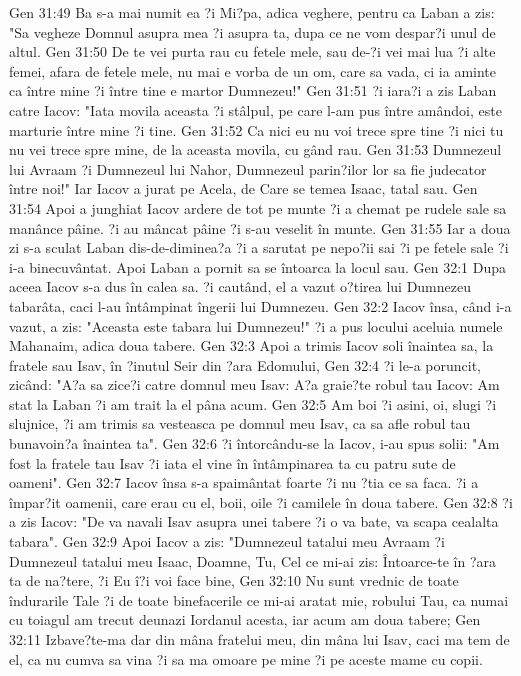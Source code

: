 Gen 31:49  Ba s-a mai numit ea ?i Mi?pa, adica veghere, pentru ca Laban a zis: "Sa vegheze Domnul asupra mea ?i asupra ta, dupa ce ne vom despar?i unul de altul.
Gen 31:50  De te vei purta rau cu fetele mele, sau de-?i vei mai lua ?i alte femei, afara de fetele mele, nu mai e vorba de un om, care sa vada, ci ia aminte ca între mine ?i între tine e martor Dumnezeu!"
Gen 31:51  ?i iara?i a zis Laban catre Iacov: "Iata movila aceasta ?i stâlpul, pe care l-am pus între amândoi, este marturie între mine ?i tine.
Gen 31:52  Ca nici eu nu voi trece spre tine ?i nici tu nu vei trece spre mine, de la aceasta movila, cu gând rau.
Gen 31:53  Dumnezeul lui Avraam ?i Dumnezeul lui Nahor, Dumnezeul parin?ilor lor sa fie judecator între noi!" Iar Iacov a jurat pe Acela, de Care se temea Isaac, tatal sau.
Gen 31:54  Apoi a junghiat Iacov ardere de tot pe munte ?i a chemat pe rudele sale sa manânce pâine. ?i au mâncat pâine ?i s-au veselit în munte.
Gen 31:55  Iar a doua zi s-a sculat Laban dis-de-diminea?a ?i a sarutat pe nepo?ii sai ?i pe fetele sale ?i i-a binecuvântat. Apoi Laban a pornit sa se întoarca la locul sau.
Gen 32:1  Dupa aceea Iacov s-a dus în calea sa. ?i cautând, el a vazut o?tirea lui Dumnezeu tabarâta, caci l-au întâmpinat îngerii lui Dumnezeu.
Gen 32:2  Iacov însa, când i-a vazut, a zis: "Aceasta este tabara lui Dumnezeu!" ?i a pus locului aceluia numele Mahanaim, adica doua tabere.
Gen 32:3  Apoi a trimis Iacov soli înaintea sa, la fratele sau Isav, în ?inutul Seir din ?ara Edomului,
Gen 32:4  ?i le-a poruncit, zicând: "A?a sa zice?i catre domnul meu Isav: A?a graie?te robul tau Iacov: Am stat la Laban ?i am trait la el pâna acum.
Gen 32:5  Am boi ?i asini, oi, slugi ?i slujnice, ?i am trimis sa vesteasca pe domnul meu Isav, ca sa afle robul tau bunavoin?a înaintea ta".
Gen 32:6  ?i întorcându-se la Iacov, i-au spus solii: "Am fost la fratele tau Isav ?i iata el vine în întâmpinarea ta cu patru sute de oameni".
Gen 32:7  Iacov însa s-a spaimântat foarte ?i nu ?tia ce sa faca. ?i a împar?it oamenii, care erau cu el, boii, oile ?i camilele în doua tabere.
Gen 32:8  ?i a zis Iacov: "De va navali Isav asupra unei tabere ?i o va bate, va scapa cealalta tabara".
Gen 32:9  Apoi Iacov a zis: "Dumnezeul tatalui meu Avraam ?i Dumnezeul tatalui meu Isaac, Doamne, Tu, Cel ce mi-ai zis: Întoarce-te în ?ara ta de na?tere, ?i Eu î?i voi face bine,
Gen 32:10  Nu sunt vrednic de toate îndurarile Tale ?i de toate binefacerile ce mi-ai aratat mie, robului Tau, ca numai cu toiagul am trecut deunazi Iordanul acesta, iar acum am doua tabere;
Gen 32:11  Izbave?te-ma dar din mâna fratelui meu, din mâna lui Isav, caci ma tem de el, ca nu cumva sa vina ?i sa ma omoare pe mine ?i pe aceste mame cu copii.
